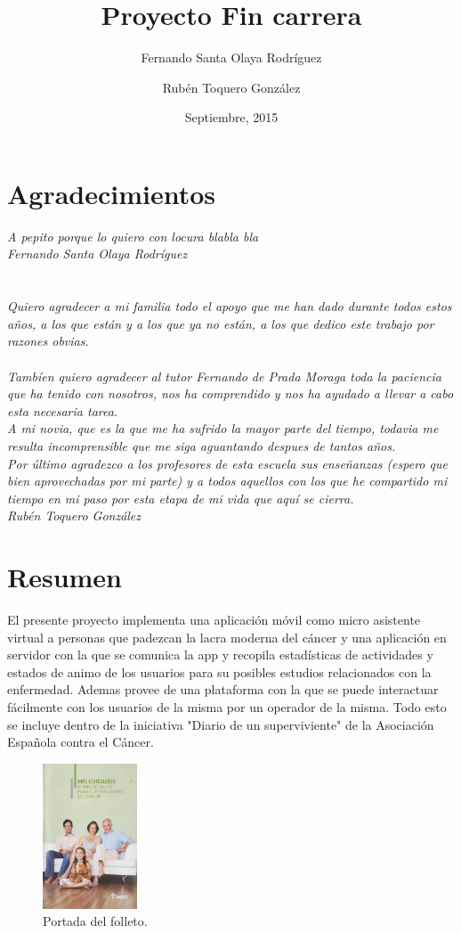 \documentclass[b5paper,10pt,twoside]{book}
\title{Proyecto Fin carrera}
\author{Fernando Santa Olaya Rodríguez \\
	\and 
	Rubén Toquero González}
\date{Septiembre, 2015}
\begin{document}
	\maketitle
	

	\chapter*{Agradecimientos}

	
	\textit{A pepito porque lo quiero con locura blabla bla\\
		Fernando Santa Olaya Rodríguez\\\\\\
		Quiero agradecer a mi familia todo el apoyo que me han dado durante todos estos años, a los que están y a los que ya no están, a los que dedico este trabajo por razones obvias.\\\\
		Tambíen quiero agradecer al tutor Fernando de Prada Moraga toda la paciencia que ha tenido con nosotros, nos ha comprendido y nos ha ayudado a llevar a cabo esta necesaria tarea.\\
		A mi novia, que es la que me ha sufrido la mayor parte del tiempo, todavia me resulta incomprensible que me siga aguantando despues de tantos años.\\
		Por último agradezco a los profesores de esta escuela sus enseñanzas (espero que bien aprovechadas por mi parte) y a todos aquellos con los que he compartido mi tiempo en mi paso por esta etapa de mi vida que aquí se cierra.\\
		Rubén Toquero González} 
	

	\chapter*{Resumen}
	 	El presente proyecto implementa una aplicación móvil como micro asistente virtual a personas que padezcan la lacra moderna del cáncer y una aplicación en servidor con la que se comunica la app y recopila estadísticas de actividades y estados de animo de los usuarios para su posibles estudios relacionados con la enfermedad. Ademas provee de una plataforma con la que se puede interactuar fácilmente con los usuarios de la misma por un operador de la misma. Todo esto se incluye dentro de la iniciativa "Diario de un superviviente" de la Asociación Española contra el Cáncer.
	 	
	\begin{figure}[h]
		\centering
		\includegraphics[width=0.25\textwidth]{fotointro}
		\caption{Portada del folleto.}
		\label{fig:mesh1}
	\end{figure}
	 
\end{document}
